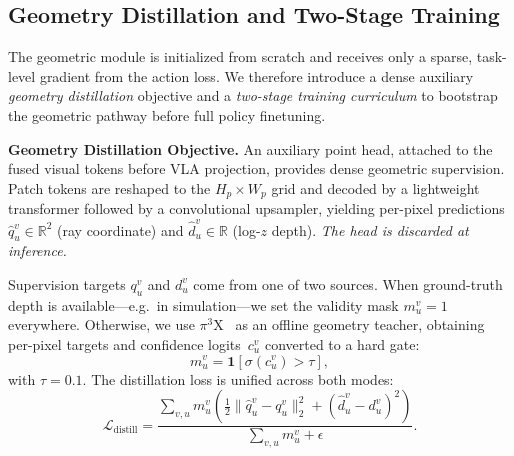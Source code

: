 \documentclass{article}
\begin{document}
\subsection{Geometry Distillation and Two-Stage Training}
\label{sub:training}

The geometric module is initialized from scratch and receives only a sparse,
task-level gradient from the action loss.  We therefore introduce a dense
auxiliary \emph{geometry distillation} objective and a \emph{two-stage training
curriculum} to bootstrap the geometric pathway before full policy finetuning.

\textbf{Geometry Distillation Objective.}
An auxiliary point head, attached to the fused visual tokens before VLA
projection, provides dense geometric supervision.  Patch tokens are reshaped to
the $H_p\!\times\!W_p$ grid and decoded by a lightweight transformer followed
by a convolutional upsampler, yielding per-pixel predictions
$\hat{q}_u^v\!\in\!\mathbb{R}^2$ (ray coordinate) and
$\hat{d}_u^v\!\in\!\mathbb{R}$ (log-$z$ depth). \textit{The head is discarded at
inference.}

Supervision targets $q_u^v$ and $d_u^v$ come from one of two sources.  When
ground-truth depth is available---e.g.\ in simulation---we set the validity
mask $m_u^v=1$ everywhere.  Otherwise, we use
$\pi^3$X~\citep{wang2025pi3} as an offline geometry teacher, obtaining
per-pixel targets and confidence logits~$c_u^v$ converted to a hard gate:
\begin{equation}
    m_u^v = \mathbf{1}\!\left[\sigma(c_u^v) > \tau\right],
\end{equation}
with $\tau=0.1$.  The distillation loss is unified across both modes:
\begin{equation}
    \mathcal{L}_{\mathrm{distill}}
    = \frac{
        \displaystyle\sum_{v,u} m_u^v
        \!\left(
            \tfrac{1}{2}\lVert \hat{q}_u^v - q_u^v \rVert_2^2
            + (\hat{d}_u^v - d_u^v)^2
        \right)
    }{
        \displaystyle\sum_{v,u} m_u^v + \epsilon
    }.
\end{equation}

\end{document}
